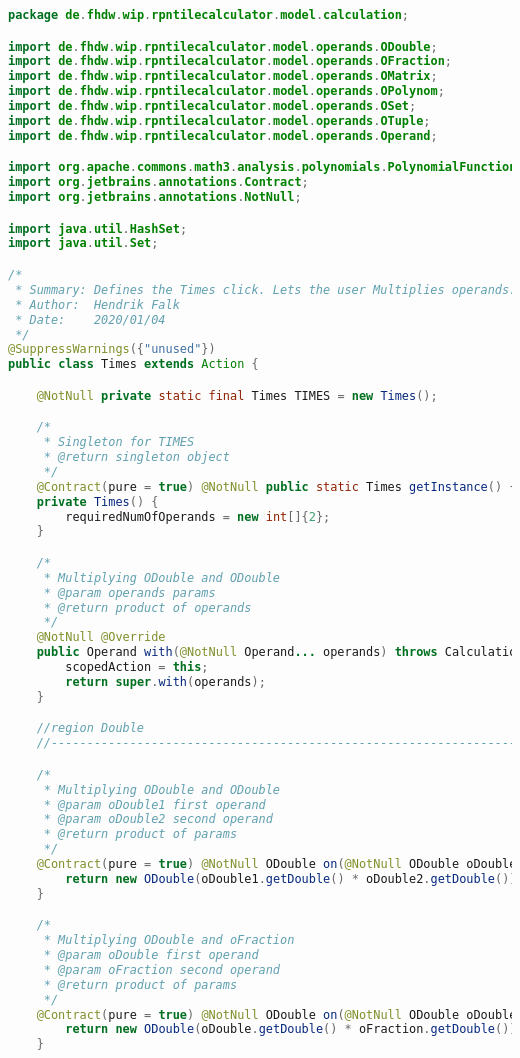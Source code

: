 \begin{lstlisting}[caption=Times (Falk),label=list:Times,language=Java]
package de.fhdw.wip.rpntilecalculator.model.calculation;

import de.fhdw.wip.rpntilecalculator.model.operands.ODouble;
import de.fhdw.wip.rpntilecalculator.model.operands.OFraction;
import de.fhdw.wip.rpntilecalculator.model.operands.OMatrix;
import de.fhdw.wip.rpntilecalculator.model.operands.OPolynom;
import de.fhdw.wip.rpntilecalculator.model.operands.OSet;
import de.fhdw.wip.rpntilecalculator.model.operands.OTuple;
import de.fhdw.wip.rpntilecalculator.model.operands.Operand;

import org.apache.commons.math3.analysis.polynomials.PolynomialFunction;
import org.jetbrains.annotations.Contract;
import org.jetbrains.annotations.NotNull;

import java.util.HashSet;
import java.util.Set;

/*
 * Summary: Defines the Times click. Lets the user Multiplies operands.
 * Author:  Hendrik Falk
 * Date:    2020/01/04
 */
@SuppressWarnings({"unused"})
public class Times extends Action {

    @NotNull private static final Times TIMES = new Times();

    /*
     * Singleton for TIMES
     * @return singleton object
     */
    @Contract(pure = true) @NotNull public static Times getInstance() { return TIMES; }
    private Times() {
        requiredNumOfOperands = new int[]{2};
    }

    /*
     * Multiplying ODouble and ODouble
     * @param operands params
     * @return product of operands
     */
    @NotNull @Override
    public Operand with(@NotNull Operand... operands) throws CalculationException {
        scopedAction = this;
        return super.with(operands);
    }

    //region Double
    //------------------------------------------------------------------------------------

    /*
     * Multiplying ODouble and ODouble
     * @param oDouble1 first operand
     * @param oDouble2 second operand
     * @return product of params
     */
    @Contract(pure = true) @NotNull ODouble on(@NotNull ODouble oDouble1, @NotNull ODouble oDouble2) {
        return new ODouble(oDouble1.getDouble() * oDouble2.getDouble());
    }

    /*
     * Multiplying ODouble and oFraction
     * @param oDouble first operand
     * @param oFraction second operand
     * @return product of params
     */
    @Contract(pure = true) @NotNull ODouble on(@NotNull ODouble oDouble, @NotNull OFraction oFraction) {
        return new ODouble(oDouble.getDouble() * oFraction.getDouble());
    }


\end{lstlisting}
